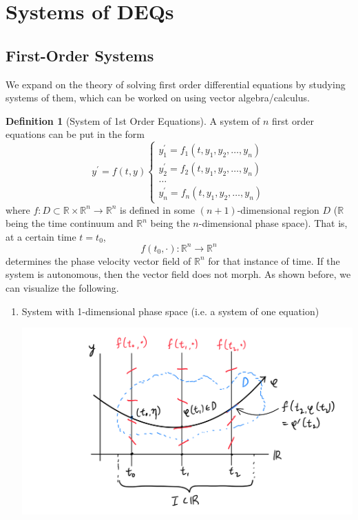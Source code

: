 \documentclass{article}
\theoremstyle{remark}
\theoremstyle{definition}
\newtheorem{definition}{Definition}[section]
\begin{document}
\section{Systems of DEQs}

  \subsection{First-Order Systems}

    We expand on the theory of solving first order differential equations by studying systems of them, which can be worked on using vector algebra/calculus. 

    \begin{definition}[System of 1st Order Equations]
    A system of $n$ first order equations can be put in the form 
    \[y^\prime = f(t, y) \begin{cases}
    y_1^\prime  = f_1 (t, y_1, y_2, \ldots, y_n) \\
    y_2^\prime  = f_2 (t, y_1, y_2, \ldots, y_n) \\
    \ldots \\
    y_n^\prime  = f_n (t, y_1, y_2, \ldots, y_n) 
    \end{cases}\]
    where $f: D \subset \mathbb{R} \times \mathbb{R}^n \longrightarrow \mathbb{R}^n$ is defined in some $(n+1)$-dimensional region $D$ ($\mathbb{R}$ being the time continuum and $\mathbb{R}^n$ being the $n$-dimensional phase space). That is, at a certain time $t = t_0$, 
    \[f(t_0, \cdot): \mathbb{R}^n \longrightarrow \mathbb{R}^n\]
    determines the phase velocity vector field of $\mathbb{R}^n$ for that instance of time. If the system is autonomous, then the vector field does not morph. As shown before, we can visualize the following. 
    \begin{enumerate}
        \item System with 1-dimensional phase space (i.e. a system of one equation) 
        \begin{center}
            \includegraphics[scale=0.26]{img/System_w_1_dim_Phase_Space.PNG}

\end{center}
\end{enumerate}
\end{definition}
\end{document}
